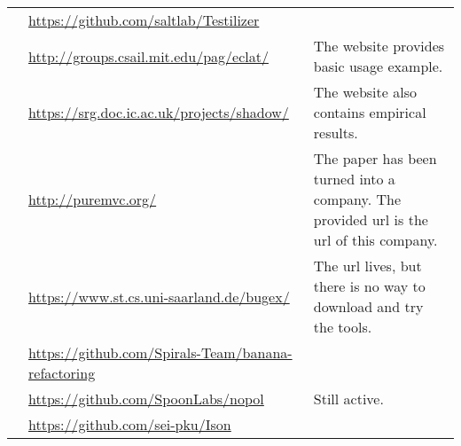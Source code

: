 \begin{table*}[ht]
\begin{tabularx}{\textwidth}{lXX}
    \cite{milani2014}                         & \url{https://github.com/saltlab/Testilizer}                       & \\
    \cite{Pacheco2005}                        & \url{http://groups.csail.mit.edu/pag/eclat/}                      & The website provides basic usage example.\\
    \cite{palikareva2016shadow}               & \url{https://srg.doc.ic.ac.uk/projects/shadow/}                   & The website also contains empirical results.\\
    \cite{pezze2013}                          & \url{http://puremvc.org/}                                         & The paper has been turned into a company. The provided url is the url of this company.\\
    \cite{robetaler2012isolating}             & \url{https://www.st.cs.uni-saarland.de/bugex/}                    & The url lives, but there is no way to download and try the tools. \\ %
    \cite{xuan:hal-01309004}                  & \url{https://github.com/Spirals-Team/banana-refactoring}          & \\
    \cite{xuanTSE2016Nopol}                   & \url{https://github.com/SpoonLabs/nopol}                          & Still active. \\
    \cite{Zhang2016Isomorphic}                & \url{https://github.com/sei-pku/Ison}                             & \\

\end{tabularx}
\end{table*}
